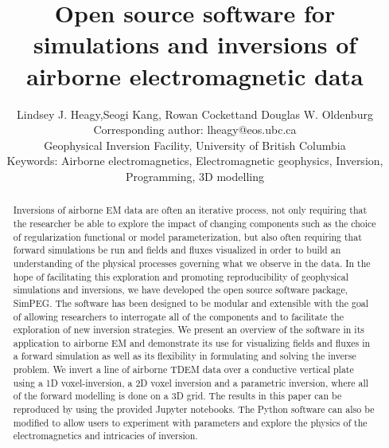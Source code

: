 \documentclass[paper]{geophysics}
\begin{document}
\title{Open source software for simulations and inversions of airborne electromagnetic data}

\renewcommand{\thefootnote}{\fnsymbol{footnote}}


\address{
\footnotemark[1]Geophyscial Inversion Facility, \\
University of British Columbia, Canada\\
BC, Vancouver}

\author{Lindsey J. Heagy\footnotemark[1],\footnotemark[2] Seogi Kang\footnotemark[2], Rowan Cockett\footnotemark[2] and Douglas W. Oldenburg\footnotemark[2]\\[16pt]
{\normalfont \small
\footnotemark[1]
Corresponding author: lheagy@eos.ubc.ca \\
\footnotemark[2]
Geophysical Inversion Facility, University of British Columbia
}\\[16pt]
{
\normalfont \small
Keywords: Airborne electromagnetics, Electromagnetic geophysics, Inversion, Programming, 3D modelling
}
}


\maketitle

\begin{abstract}
Inversions of airborne EM data are often an iterative process, not only requiring that the researcher be able to explore the impact of changing components such as the choice of regularization functional or model parameterization, but also often requiring that forward simulations be run and fields and fluxes visualized in order to build an understanding of the physical processes governing what we observe in the data. In the hope of facilitating this exploration and promoting reproducibility of geophysical simulations and inversions, we have developed the open source software package, SimPEG. The software has been designed to be modular and extensible with the goal of allowing researchers to interrogate all of the components and to facilitate the exploration of new inversion strategies. We present an overview of the software in its application to airborne EM and demonstrate its use for visualizing fields and fluxes in a forward simulation as well as its flexibility in formulating and solving the inverse problem. We invert a line of airborne TDEM data over a conductive vertical plate using a 1D voxel-inversion, a 2D voxel inversion and a parametric inversion, where all of the forward modelling is done on a 3D grid. The results in this paper can be reproduced  by using the provided Jupyter notebooks. The Python software can also be modified to allow users to experiment with parameters and explore the physics of the electromagnetics and intricacies of inversion.
\end{abstract}
\end{document}
